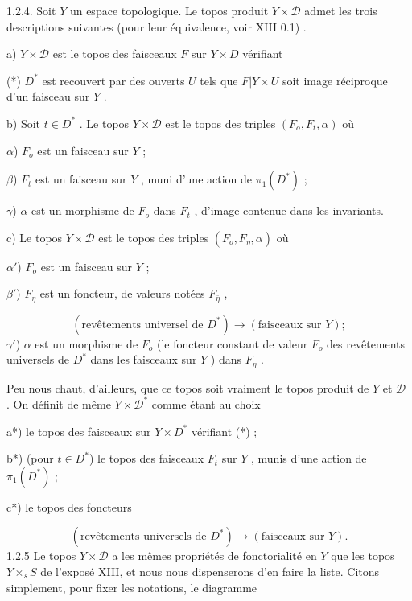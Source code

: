 1.2.4. Soit $Y$ un espace topologique. Le topos produit $Y \times \mathcal{D}$ admet les trois descriptions suivantes (pour leur équivalence, voir XIII 0.1) .

a) $Y \times \mathcal{D}$ est le topos des faisceaux $F$ sur $Y \times D$ vérifiant

(*) $D^*$ est recouvert par des ouverts $U$ tels que $F | Y \times U$ soit image réciproque d'un faisceau sur $Y$ .

b) Soit $t \in D^*$ . Le topos $Y \times \mathcal{D}$ est le topos des triples $(F_o, F_t, \alpha)$ où

$\alpha$) $F_o$ est un faisceau sur $Y$ ;

$\beta$) $F_t$ est un faisceau sur $Y$ , muni d'une action de $\pi_1(D^*)$ ;

$\gamma$) $\alpha$ est un morphisme de $F_o$ dans $F_t$ , d'image contenue dans les invariants.

c) Le topos $Y \times \mathcal{D}$ est le topos des triples $(F_o, F_\eta, \alpha)$ où

$\alpha'$) $F_o$ est un faisceau sur $Y$ ;

$\beta'$) $F_\eta$ est un foncteur, de valeurs notées $F_{\bar\eta}$ ,

\begin{equation*}
(\text{revêtements universel de } D^*) \longrightarrow (\text{faisceaux sur } Y ) ;
\end{equation*}
$\gamma'$) $\alpha$ est un morphisme de $F_o$ (le foncteur constant de valeur $F_o$ des revêtements universels de $D^*$ dans les faisceaux sur $Y$ ) dans $F_\eta$ .

Peu nous chaut, d'ailleurs, que ce topos soit vraiment le topos produit de $Y$ et $\mathcal{D}$ . On définit de même $Y \times \mathcal{D}^*$ comme étant au choix

a*) le topos des faisceaux sur $Y \times D^*$ vérifiant (*) ;

b*) (pour $t \in D^*$) le topos des faisceaux $F_t$ sur $Y$ , munis d'une action de $\pi_1(D^*)$ ;

c*) le topos des foncteurs

\begin{equation*}
(\text{revêtements universels de } D^*) \longrightarrow (\text{faisceaux sur } Y ).
\end{equation*}
1.2.5 Le topos $Y \times \mathcal{D}$ a les mêmes propriétés de fonctorialité en $Y$ que les topos $Y \times_s S$ de l'exposé XIII, et nous nous dispenserons d'en faire la liste. Citons simplement, pour fixer les notations, le diagramme 


